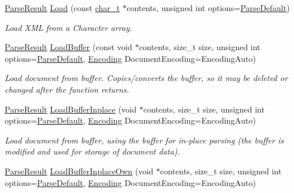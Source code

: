 \begin{DoxyCompactItemize}
\hyperlink{structphys_1_1xml_1_1ParseResult}{ParseResult} \hyperlink{classphys_1_1xml_1_1Document_a7ae98719610eefc5c05255e305c75e56}{Load} (const \hyperlink{namespacephys_1_1xml_afc87705cd1c2917d87b879715a2d8f6e}{char\_\-t} $\ast$contents, unsigned int options=\hyperlink{namespacephys_1_1xml_aa6b8f7f8c2322fd683a235b498834d60}{ParseDefault})
\begin{DoxyCompactList}\small\item\em Load XML from a Character array. \item\end{DoxyCompactList}\item 
\hyperlink{structphys_1_1xml_1_1ParseResult}{ParseResult} \hyperlink{classphys_1_1xml_1_1Document_a31c36783e033d6d43d51e31a6dd4099f}{LoadBuffer} (const void $\ast$contents, size\_\-t size, unsigned int options=\hyperlink{namespacephys_1_1xml_aa6b8f7f8c2322fd683a235b498834d60}{ParseDefault}, \hyperlink{namespacephys_1_1xml_a420f5de782438f88160321385bea2015}{Encoding} DocumentEncoding=EncodingAuto)
\begin{DoxyCompactList}\small\item\em Load document from buffer. Copies/converts the buffer, so it may be deleted or changed after the function returns. \item\end{DoxyCompactList}\item 
\hyperlink{structphys_1_1xml_1_1ParseResult}{ParseResult} \hyperlink{classphys_1_1xml_1_1Document_ad1dd510bd1106edb92c69715eb015dc3}{LoadBufferInplace} (void $\ast$contents, size\_\-t size, unsigned int options=\hyperlink{namespacephys_1_1xml_aa6b8f7f8c2322fd683a235b498834d60}{ParseDefault}, \hyperlink{namespacephys_1_1xml_a420f5de782438f88160321385bea2015}{Encoding} DocumentEncoding=EncodingAuto)
\begin{DoxyCompactList}\small\item\em Load document from buffer, using the buffer for in-\/place parsing (the buffer is modified and used for storage of document data). \item\end{DoxyCompactList}\item 
\hyperlink{structphys_1_1xml_1_1ParseResult}{ParseResult} \hyperlink{classphys_1_1xml_1_1Document_a9213b8bf4fa5423ea292a3d03c826608}{LoadBufferInplaceOwn} (void $\ast$contents, size\_\-t size, unsigned int options=\hyperlink{namespacephys_1_1xml_aa6b8f7f8c2322fd683a235b498834d60}{ParseDefault}, \hyperlink{namespacephys_1_1xml_a420f5de782438f88160321385bea2015}{Encoding} DocumentEncoding=EncodingAuto)

\end{DoxyCompactItemize}

